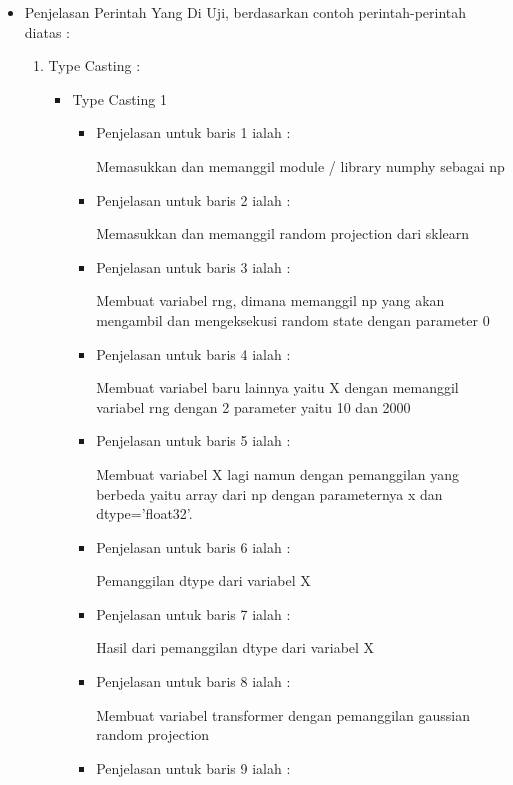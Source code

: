 \begin{itemize}
\begin{itemize}
\par
\item Penjelasan Perintah Yang Di Uji, berdasarkan contoh perintah-perintah diatas :
\begin{enumerate}
\item Type Casting :
\begin{itemize}
\item Type Casting 1
\par
\begin{itemize}
\item Penjelasan untuk baris 1 ialah : 
\par Memasukkan dan memanggil module / library numphy sebagai np
\par
\par
\item Penjelasan untuk baris 2 ialah :
\par Memasukkan dan memanggil random projection dari sklearn
\par
\item Penjelasan untuk baris 3  ialah :
\par Membuat variabel rng, dimana memanggil np yang akan mengambil dan mengeksekusi random state dengan parameter 0
\par
\item Penjelasan untuk baris 4  ialah :
\par Membuat variabel baru lainnya yaitu X dengan memanggil variabel rng dengan 2 parameter yaitu 10 dan 2000
\par
\item Penjelasan untuk baris 5  ialah :
\par Membuat variabel X lagi namun dengan pemanggilan yang berbeda yaitu array dari np dengan parameternya x dan dtype='float32'.
\par
\item Penjelasan untuk baris 6 ialah :
\par Pemanggilan dtype dari variabel X
\par
\item Penjelasan untuk baris 7 ialah : 
\par Hasil dari pemanggilan dtype dari variabel X
\par
\par
\item Penjelasan untuk baris 8 ialah :
\par Membuat variabel transformer dengan pemanggilan gaussian random projection
\par
\item Penjelasan untuk baris 9 ialah :

\end{itemize}
\end{itemize}
\end{enumerate}
\end{itemize}
\end{itemize}

